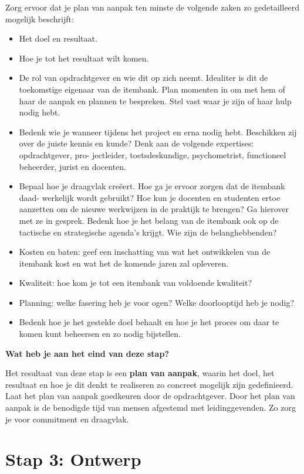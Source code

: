 \documentclass[
]{book}
\providecommand{\tightlist}{%
  \setlength{\itemsep}{0pt}\setlength{\parskip}{0pt}}
\begin{document}
Zorg ervoor dat je plan van aanpak ten minste de volgende zaken zo gedetailleerd mogelijk beschrijft:

\begin{itemize}
\tightlist
\item
  Het doel en resultaat.
\item
  Hoe je tot het resultaat wilt komen.
\item
  De rol van opdrachtgever en wie dit op zich neemt. Idealiter is dit de toekomstige eigenaar van de itembank. Plan momenten in om met hem of haar de aanpak en plannen te bespreken. Stel vast waar je zijn of haar hulp nodig hebt.
\item
  Bedenk wie je wanneer tijdens het project en erna nodig hebt. Beschikken zij over de juiste kennis en kunde? Denk aan de volgende expertises: opdrachtgever, pro- jectleider, toetsdeskundige, psychometrist, functioneel beheerder, jurist en docenten.
\item
  Bepaal hoe je draagvlak creëert. Hoe ga je ervoor zorgen dat de itembank daad- werkelijk wordt gebruikt? Hoe kun je docenten en studenten ertoe aanzetten om de nieuwe werkwijzen in de praktijk te brengen? Ga hierover met ze in gesprek. Bedenk hoe je het belang van de itembank ook op de tactische en strategische agenda's krijgt. Wie zijn de belanghebbenden?
\item
  Kosten en baten: geef een inschatting van wat het ontwikkelen van de itembank kost en wat het de komende jaren zal opleveren.
\item
  Kwaliteit: hoe kom je tot een itembank van voldoende kwaliteit?
\item
  Planning: welke fasering heb je voor ogen? Welke doorlooptijd heb je nodig?
\item
  Bedenk hoe je het gestelde doel behaalt en hoe je het proces om daar te komen kunt beheersen en zo nodig bijstellen.
\end{itemize}

\textbf{Wat heb je aan het eind van deze stap?}

Het resultaat van deze stap is een \textbf{plan van aanpak}, waarin het doel, het resultaat en hoe je dit denkt te realiseren zo concreet mogelijk zijn gedefinieerd. Laat het plan van aanpak goedkeuren door de opdrachtgever. Door het plan van aanpak is de benodigde tijd van mensen afgestemd met leidinggevenden. Zo zorg je voor commitment en draagvlak.

\hypertarget{stap-3-ontwerp}{%
\section{Stap 3: Ontwerp}\label{stap-3-ontwerp}}
\end{document}
